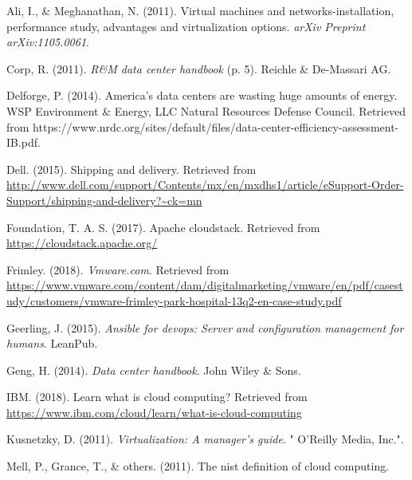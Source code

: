 \documentclass[12pt,twoside]{reedthesis}
\begin{document}

\noindent

\setlength{\parindent}{-0.20in}
\setlength{\leftskip}{0.20in}
\setlength{\parskip}{8pt}

\hypertarget{refs}{}
\leavevmode\hypertarget{ref-Cap3_2_mT}{}%
Ali, I., \& Meghanathan, N. (2011). Virtual machines and networks-installation, performance study, advantages and virtualization options. \emph{arXiv Preprint arXiv:1105.0061}.

\leavevmode\hypertarget{ref-Cap1_4_PdP}{}%
Corp, R. (2011). \emph{R\&M data center handbook} (p. 5). Reichle \& De-Massari AG.

\leavevmode\hypertarget{ref-Cap1_2_PdP}{}%
Delforge, P. (2014). America's data centers are wasting huge amounts of energy. WSP Environment \& Energy, LLC Natural Resources Defense Council. Retrieved from https://www.nrdc.org/sites/default/files/data-center-efficiency-assessment-IB.pdf.

\leavevmode\hypertarget{ref-Cap1_3_PdP}{}%
Dell. (2015). Shipping and delivery. Retrieved from \url{http://www.dell.com/support/Contents/mx/en/mxdhs1/article/eSupport-Order-Support/shipping-and-delivery?~ck=mn}

\leavevmode\hypertarget{ref-Cap3_5_mT}{}%
Foundation, T. A. S. (2017). Apache cloudstack. Retrieved from \url{https://cloudstack.apache.org/}

\leavevmode\hypertarget{ref-Cap1_Hospital}{}%
Frimley. (2018). \emph{Vmware.com}. Retrieved from \url{https://www.vmware.com/content/dam/digitalmarketing/vmware/en/pdf/casestudy/customers/vmware-frimley-park-hospital-13q2-en-case-study.pdf}

\leavevmode\hypertarget{ref-Cap3_8mT}{}%
Geerling, J. (2015). \emph{Ansible for devops: Server and configuration management for humans}. LeanPub.

\leavevmode\hypertarget{ref-Cap1_5_PdP}{}%
Geng, H. (2014). \emph{Data center handbook}. John Wiley \& Sons.

\leavevmode\hypertarget{ref-ibmcloud}{}%
IBM. (2018). Learn what is cloud computing? Retrieved from \url{https://www.ibm.com/cloud/learn/what-is-cloud-computing}

\leavevmode\hypertarget{ref-Cap3_1_mT}{}%
Kusnetzky, D. (2011). \emph{Virtualization: A manager's guide}. " O'Reilly Media, Inc.".

\leavevmode\hypertarget{ref-Cap3_3_mT}{}%
Mell, P., Grance, T., \& others. (2011). The nist definition of cloud computing.
\end{document}
